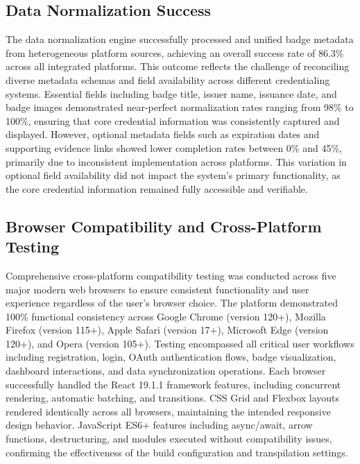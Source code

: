 \documentclass[12pt,a4paper]{article}
\begin{document}
\subsection{Data Normalization Success}

The data normalization engine successfully processed and unified badge metadata from heterogeneous platform sources, achieving an overall success rate of 86.3\% across all integrated platforms. This outcome reflects the challenge of reconciling diverse metadata schemas and field availability across different credentialing systems. Essential fields including badge title, issuer name, issuance date, and badge images demonstrated near-perfect normalization rates ranging from 98\% to 100\%, ensuring that core credential information was consistently captured and displayed. However, optional metadata fields such as expiration dates and supporting evidence links showed lower completion rates between 0\% and 45\%, primarily due to inconsistent implementation across platforms. This variation in optional field availability did not impact the system's primary functionality, as the core credential information remained fully accessible and verifiable.

\subsection{Browser Compatibility and Cross-Platform Testing}

Comprehensive cross-platform compatibility testing was conducted across five major modern web browsers to ensure consistent functionality and user experience regardless of the user's browser choice. The platform demonstrated 100\% functional consistency across Google Chrome (version 120+), Mozilla Firefox (version 115+), Apple Safari (version 17+), Microsoft Edge (version 120+), and Opera (version 105+). Testing encompassed all critical user workflows including registration, login, OAuth authentication flows, badge visualization, dashboard interactions, and data synchronization operations. Each browser successfully handled the React 19.1.1 framework features, including concurrent rendering, automatic batching, and transitions. CSS Grid and Flexbox layouts rendered identically across all browsers, maintaining the intended responsive design behavior. JavaScript ES6+ features including async/await, arrow functions, destructuring, and modules executed without compatibility issues, confirming the effectiveness of the build configuration and transpilation settings.
\end{document}
